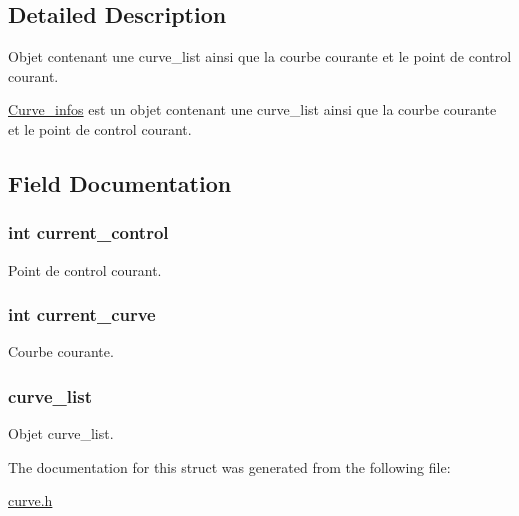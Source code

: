 \subsection{Detailed Description}
Objet contenant une curve\+\_\+list ainsi que la courbe courante et le point de control courant. 

\hyperlink{struct_curve__infos}{Curve\+\_\+infos} est un objet contenant une curve\+\_\+list ainsi que la courbe courante et le point de control courant. 

\subsection{Field Documentation}
\subsubsection[{\texorpdfstring{current\+\_\+control}{current_control}}]{\setlength{\rightskip}{0pt plus 5cm}int current\+\_\+control}\hypertarget{struct_curve__infos_ac29ff01cfeacc113317497e57f0bd892}{}\label{struct_curve__infos_ac29ff01cfeacc113317497e57f0bd892}
Point de control courant. 
\subsubsection[{\texorpdfstring{current\+\_\+curve}{current_curve}}]{\setlength{\rightskip}{0pt plus 5cm}int current\+\_\+curve}\hypertarget{struct_curve__infos_a1dfb6df9eb8f617d17265d99305c8464}{}\label{struct_curve__infos_a1dfb6df9eb8f617d17265d99305c8464}
Courbe courante. 
\subsubsection[{\texorpdfstring{curve\+\_\+list}{curve_list}}]{ curve\+\_\+list}\hypertarget{struct_curve__infos_ac27e69087504043a258d19abcaa6cc95}{}\label{struct_curve__infos_ac27e69087504043a258d19abcaa6cc95}
Objet curve\+\_\+list. 

The documentation for this struct was generated from the following file\+:\begin{DoxyCompactItemize}
\item 
\hyperlink{curve_8h}{curve.\+h}\end{DoxyCompactItemize}
